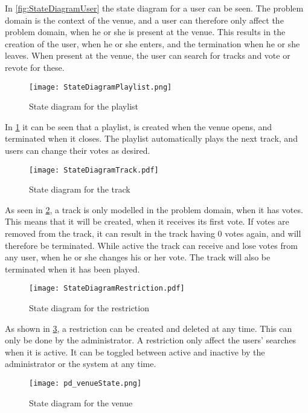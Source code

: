 In \cref{fig:StateDiagramUser} the state diagram for a user can be seen. The problem domain is the context of the venue, and a user can therefore only affect the problem domain, when he or she is present at the venue. This results in the creation of the user, when he or she enters, and the termination when he or she leaves. When present at the venue, the user can search for tracks and vote or revote for these.

\begin{figure}[H]
  \centering
  \texttt{[image: StateDiagramPlaylist.png]}
  \caption{State diagram for the playlist}\label{fig:StateDiagramPlaylist}
\end{figure}

In \cref{fig:StateDiagramPlaylist} it can be seen that a playlist, is created when the venue opens, and terminated when it closes. The playlist automatically plays the next track, and users can change their votes as desired.

\begin{figure}[H]
  \centering
  \texttt{[image: StateDiagramTrack.pdf]}
  \caption{State diagram for the track}\label{fig:StateDiagramTrack}
\end{figure}

As seen in \cref{fig:StateDiagramTrack}, a track is only modelled in the problem domain, when it has votes. This means that it will be created, when it receives its first vote. If votes are removed from the track, it can result in the track having 0 votes again, and will therefore be terminated. While active the track can receive and lose votes from any user, when he or she changes his or her vote. The track will also be terminated when it has been played.

\begin{figure}[H]
  \centering
  \texttt{[image: StateDiagramRestriction.pdf]}
  \caption{State diagram for the restriction}\label{fig:StateDiagramRestriction}
\end{figure}

As shown in \cref{fig:StateDiagramRestriction}, a restriction can be created and deleted at any time. This can only be done by the administrator. A restriction only affect the users' searches when it is active. It can be toggled between active and inactive by the administrator or the system at any time.

\begin{figure}[H]
  \centering
  \texttt{[image: pd\_venueState.png]}
  \caption{State diagram for the venue}\label{fig:StateDiagramVenue}
\end{figure}

